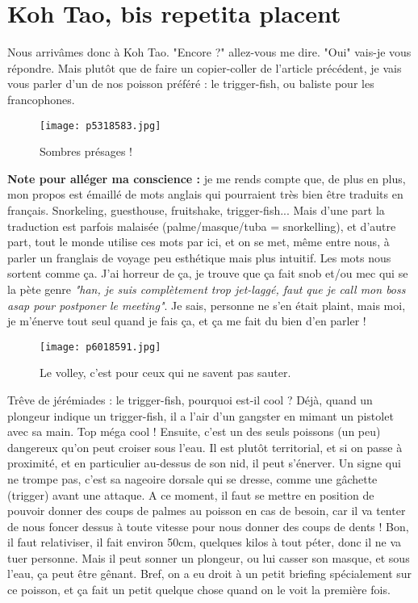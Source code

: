 \documentclass{book}
\begin{document}
\chapter{Koh Tao, bis repetita placent}
Nous arrivâmes donc à Koh Tao. "Encore ?" allez-vous me dire. "Oui" vais-je vous répondre. Mais plutôt que de faire un copier-coller de l'article précédent, je vais vous parler d'un de nos poisson préféré : le trigger-fish, ou baliste pour les francophones.


\begin{figure}[h]
\centering
\texttt{[image: p5318583.jpg]}
\caption*{Sombres présages !}
\end{figure}

\textbf{Note pour alléger ma conscience :} je me rends compte que, de plus en plus, mon propos est émaillé de mots anglais qui pourraient très bien être traduits en français. Snorkeling, guesthouse, fruitshake, trigger-fish... Mais d'une part la traduction est parfois malaisée (palme/masque/tuba = snorkelling), et d'autre part, tout le monde utilise ces mots par ici, et on se met, même entre nous, à parler un franglais de voyage peu esthétique mais plus intuitif. Les mots nous sortent comme ça. J'ai horreur de ça, je trouve que ça fait snob et/ou mec qui se la pète genre \emph{"han, je suis complètement trop jet-laggé, faut que je call mon boss asap pour postponer le meeting"}. Je sais, personne ne s'en était plaint, mais moi, je m'énerve tout seul quand je fais ça, et ça me fait du bien d'en parler !


\begin{figure}[h]
\centering
\texttt{[image: p6018591.jpg]}
\caption*{Le volley, c'est pour ceux qui ne savent pas sauter.}
\end{figure}

Trêve de jérémiades : le trigger-fish, pourquoi est-il cool ? Déjà, quand un plongeur indique un trigger-fish, il a l'air d'un gangster en mimant un pistolet avec sa main. Top méga cool ! Ensuite, c'est un des seuls poissons (un peu) dangereux qu'on peut croiser sous l'eau. Il est plutôt territorial, et si on passe à proximité, et en particulier au-dessus de son nid, il peut s'énerver. Un signe qui ne trompe pas, c'est sa nageoire dorsale qui se dresse, comme une gâchette (trigger) avant une attaque. A ce moment, il faut se mettre en position de pouvoir donner des coups de palmes au poisson en cas de besoin, car il va tenter de nous foncer dessus à toute vitesse pour nous donner des coups de dents ! Bon, il faut relativiser, il fait environ 50cm, quelques kilos à tout péter, donc il ne va tuer personne. Mais il peut sonner un plongeur, ou lui casser son masque, et sous l'eau, ça peut être gênant. Bref, on a eu droit à un petit briefing spécialement sur ce poisson, et ça fait un petit quelque chose quand on le voit la première fois.
\end{document}
